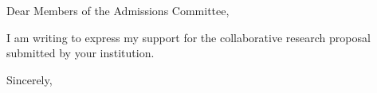 \documentclass[11pt]{hi-letter}
\date{\today}
\begin{document}
\begin{letter}

\opening{Dear Members of the Admissions Committee,}

I am writing to express my support for the collaborative research proposal submitted by your institution. 

\lipsum[1] %

\lipsum[2] %

\closing{Sincerely,}


\end{letter}
\end{document}
